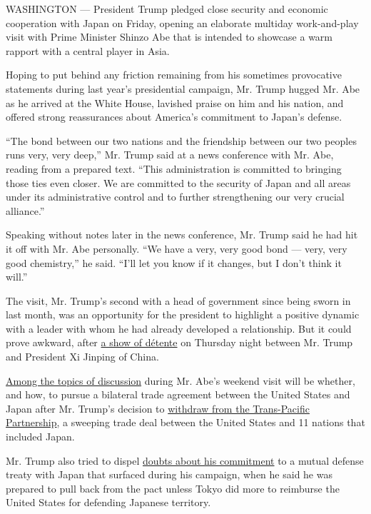 WASHINGTON --- President Trump pledged close security and economic
cooperation with Japan on Friday, opening an elaborate multiday
work-and-play visit with Prime Minister Shinzo Abe that is intended to
showcase a warm rapport with a central player in Asia.

Hoping to put behind any friction remaining from his sometimes
provocative statements during last year's presidential campaign, Mr.
Trump hugged Mr. Abe as he arrived at the White House, lavished praise
on him and his nation, and offered strong reassurances about America's
commitment to Japan's defense.

``The bond between our two nations and the friendship between our two
peoples runs very, very deep,'' Mr. Trump said at a news conference with
Mr. Abe, reading from a prepared text. ``This administration is
committed to bringing those ties even closer. We are committed to the
security of Japan and all areas under its administrative control and to
further strengthening our very crucial alliance.''

Speaking without notes later in the news conference, Mr. Trump said he
had hit it off with Mr. Abe personally. ``We have a very, very good bond
--- very, very good chemistry,'' he said. ``I'll let you know if it
changes, but I don't think it will.''

The visit, Mr. Trump's second with a head of government since being
sworn in last month, was an opportunity for the president to highlight a
positive dynamic with a leader with whom he had already developed a
relationship. But it could prove awkward, after
\href{https://www.nytimes.com/2017/02/09/world/asia/donald-trump-china-xi-jinping-letter.html}{a
show of détente} on Thursday night between Mr. Trump and President Xi
Jinping of China.

\href{https://www.nytimes.com/2017/02/09/world/asia/trump-abe-meeting-japan-trade-defense.html}{Among
the topics of discussion} during Mr. Abe's weekend visit will be
whether, and how, to pursue a bilateral trade agreement between the
United States and Japan after Mr. Trump's decision to
\href{https://www.nytimes.com/2017/01/23/us/politics/tpp-trump-trade-nafta.html}{withdraw
from the Trans-Pacific Partnership}, a sweeping trade deal between the
United States and 11 nations that included Japan.

Mr. Trump also tried to dispel
\href{http://www.japantimes.co.jp/news/2016/08/06/national/politics-diplomacy/trump-rips-u-s-defense-japan-one-sided-expensive/}{doubts
about his commitment} to a mutual defense treaty with Japan that
surfaced during his campaign, when he said he was prepared to pull back
from the pact unless Tokyo did more to reimburse the United States for
defending Japanese territory.

